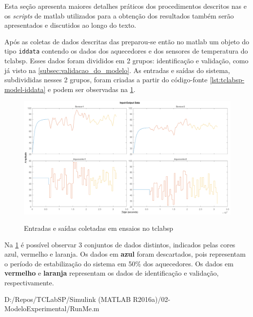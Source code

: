 Esta seção apresenta maiores detalhes práticos dos procedimentos descritos nas 
 e os
\textit{scripts} de \acrshort{matlab} utilizados para a obtenção dos resultados também serão
apresentados e discutidos ao longo do texto.

Após as coletas de dados descritas das
preparou-se então no \acrshort{matlab} um objeto do tipo \texttt{iddata} contendo os dados dos aquecedores
e dos sensores de temperatura do \acrshort{tclabsp}.
Esses dados foram divididos em 2 grupos: identificação e validação, como já visto na \cref{subsec:validacao_do_modelo}.
As entradas e saídas do sistema, subdivididas nesses 2 grupos, foram criadas a partir do código-fonte
\ref{lst:tclabsp-model-iddata} e podem ser observadas na \cref{fig:tclabsp-model-IOs}.

\begin{figure}[h]
	\caption{Entradas e saídas coletadas em ensaios no \acrshort{tclabsp}}
	\begin{center}
		\includegraphics[width=1.00\textwidth]{./5_images/tclabsp-model-IOs.png} 
		\label{fig:tclabsp-model-IOs}
	\end{center}
	\centering
\end{figure}

Na \cref{fig:tclabsp-model-IOs} é possível observar 3 conjuntos de dados distintos, indicados pelas cores 
azul, vermelho e laranja. Os dados em \textbf{azul} foram descartados, pois representam o período de 
estabilização do sistema em 50\% dos aquecedores. Os dados em \textbf{vermelho} e \textbf{laranja} representam
os dados de identificação e validação, respectivamente.


	{D:/Repos/TCLabSP/Simulink (MATLAB R2016a)/02-ModeloExperimental/RunMe.m}
	\begin{center}
    \end{center}

